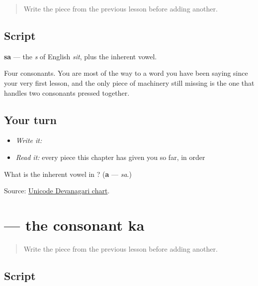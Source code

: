 \label{lesson:MR-W01-sa}



\begin{quote}
Write the piece from the previous lesson before adding another.
\end{quote}

\subsection*{Script}
\begin{quote}
\end{quote}

\textbf{sa} — the \emph{s} of English \emph{sit}, plus the inherent vowel.

Four consonants. You are most of the way to a word you have been saying since your very first lesson, and the only piece of machinery still missing is the one that handles two consonants pressed together.

\subsection*{Your turn}
\begin{itemize}
\raggedright
  \item \emph{Write it:} 
  \item \emph{Read it:} every piece this chapter has given you so far, in order
\end{itemize}

\begin{tcolorbox}[breakable,colback=teal!4,colframe=teal!35!black,title={Before you move on}]
What is the inherent vowel in \textbf{}? (\textbf{a} — \emph{sa}.)

Source: \href{https://www.unicode.org/charts/PDF/U0900.pdf}{Unicode Devanagari chart}.
\end{tcolorbox}
\section[ka]{ — the consonant ka}

\label{lesson:MR-W01-ka}



\begin{quote}
Write the piece from the previous lesson before adding another.
\end{quote}

\subsection*{Script}
\begin{quote}
\end{quote}

